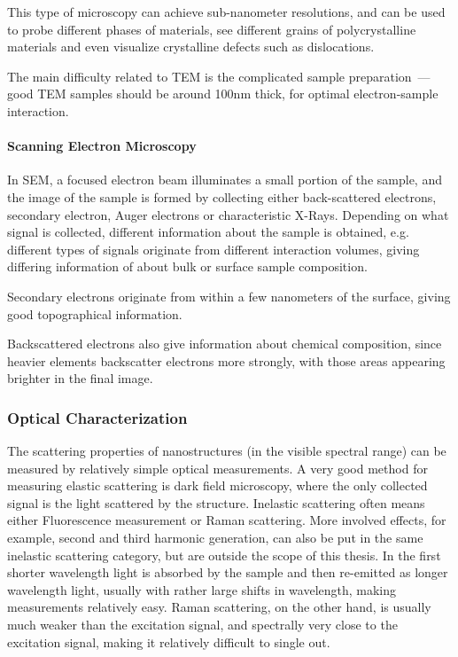                     This type of microscopy can achieve sub-nanometer resolutions, and can be used to probe different phases of materials,
                see different grains of polycrystalline materials and even visualize crystalline defects such as dislocations.

                    The main difficulty related to TEM is the complicated sample preparation~--- good TEM samples should be around 100nm thick,
                for optimal electron-sample interaction.

            \paragraph{Scanning Electron Microscopy}
                    In SEM, a focused electron beam illuminates a small portion of the sample, and the image of the sample is formed by
                collecting either back-scattered electrons, secondary electron, Auger electrons or characteristic X-Rays. Depending on what
                signal is collected, different information about the sample is obtained, e.g. different types of signals originate from
                different interaction volumes, giving differing information of about bulk or surface sample composition.

                    Secondary electrons originate from within a few nanometers of the surface, giving good topographical information.

                    Backscattered electrons also give information about chemical composition, since heavier elements backscatter electrons
                more strongly, with those areas appearing brighter in the final image.

        \subsubsection{Optical Characterization}
        \label{sec:OpticalCharacterization}

                The scattering properties of nanostructures (in the visible spectral range) can be measured by relatively simple optical
            measurements. A very good method for measuring elastic scattering is dark field microscopy, where the only collected signal
            is the light scattered by the structure. Inelastic scattering often means either Fluorescence measurement or Raman scattering.
            More involved effects, for example, second and third harmonic generation, can also be put in the same inelastic scattering category,
            but are outside the scope of this thesis.
            In the first shorter wavelength light is absorbed by the sample and then re-emitted as longer wavelength light, usually with
            rather large shifts in wavelength, making measurements relatively easy. Raman scattering, on the other hand, is usually much weaker
            than the excitation signal, and spectrally very close to the excitation signal, making it relatively difficult to single out.

